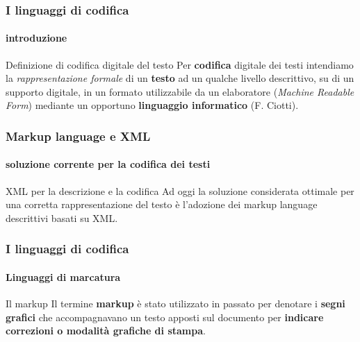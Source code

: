 \begin{frame}
	\frametitle{I linguaggi di codifica}
	\framesubtitle{introduzione}
	\addtocounter{nframe}{1}

	\begin{block}{Definizione di codifica digitale del testo}
		Per \textbf{codifica} digitale dei testi intendiamo la \textit{rappresentazione formale} di un \textbf{testo} ad un qualche livello descrittivo, su di un supporto digitale, in un formato utilizzabile da un elaboratore (\textit{Machine Readable Form}) mediante un opportuno \textbf{linguaggio informatico} (F. Ciotti).
	\end{block}

\end{frame}

\begin{frame}
	\frametitle{Markup language e XML}
	\framesubtitle{soluzione corrente per la codifica dei testi}
	\addtocounter{nframe}{1}

	\begin{block}{XML per la descrizione e la codifica}
		Ad oggi la soluzione considerata ottimale per una corretta rappresentazione del testo è l'adozione dei markup language descrittivi basati su XML.
	\end{block}

\end{frame}

\begin{frame}
	\frametitle{I linguaggi di codifica}
	\framesubtitle{Linguaggi di marcatura}
	\addtocounter{nframe}{1}

	\begin{block}{Il markup}
		Il termine \textbf{markup} è stato utilizzato in passato per denotare i \textbf{segni grafici} che accompagnavano un testo apposti sul documento per \textbf{indicare correzioni o modalità grafiche di stampa}.
	\end{block}

\end{frame}

